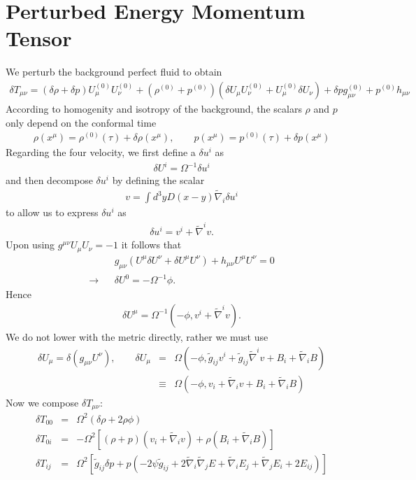 \documentclass[10pt,letterpaper]{article}
\numberwithin{equation}{section}
\begin{document}
\section{Perturbed Energy Momentum Tensor}
We perturb the background perfect fluid to obtain
\begin{eqnarray}
\delta T_{\mu\nu} = (\delta \rho + \delta p)U^{(0)}_\mu U^{(0)}_\nu + (\rho^{(0)} + p^{(0)})(\delta U_\mu U^{(0)}_\nu +U^{(0)}_\mu \delta U_\nu) + \delta p g^{(0)}_{\mu\nu} + p^{(0)} h_{\mu\nu}
\end{eqnarray}
According to homogenity and isotropy of the background, the scalars $\rho$ and $p$ only depend on the conformal time
\begin{eqnarray}
\rho(x^\mu) = \rho^{(0)}(\tau) + \delta \rho (x^\mu),\qquad p(x^\mu) = p^{(0)}(\tau) + \delta p (x^\mu)
\end{eqnarray}
Regarding the four velocity, we first define a $\delta u^i$ as
\begin{eqnarray}
\delta U^i = \Omega^{-1} \delta u^i
\end{eqnarray}
and then decompose $\delta u^i$ by defining the scalar
\begin{eqnarray}
v = \int d^3y D(x-y) \tilde\nabla_i \delta u^i
\end{eqnarray}
to allow us to express $\delta u^i$ as
\begin{eqnarray}
\delta u^i = v^i +\tilde\nabla^i v.
\end{eqnarray}
Upon using  $g^{\mu\nu}U_\mu U_\nu = -1$ it follows that
\begin{eqnarray}
&&g_{\mu\nu}(U^\mu\delta U^\nu + \delta U^\mu U^\nu) + h_{\mu\nu} U^\mu U^\nu = 0 
\nonumber\\
\to&& \delta U^0 = -\Omega^{-1}\phi.
\end{eqnarray}
Hence
\begin{eqnarray}
\delta U^\mu = \Omega^{-1}(-\phi, v^i+\tilde\nabla^i v).
\end{eqnarray}
We do not lower with the metric directly, rather we must use 
\begin{eqnarray}
\delta U_\mu = \delta(g_{\mu\nu} U^\nu),\qquad \delta U_\mu &=& \Omega(-\phi, \tilde g_{ij} v^i +\tilde g_{ij} \tilde\nabla^i v+B_i+\tilde\nabla_i B)
\nonumber\\
&\equiv &  \Omega(-\phi, v_i +\tilde \nabla_i v+B_i+\tilde\nabla_i B)
\end{eqnarray}
Now we compose $\delta T_{\mu\nu}$:
\begin{eqnarray}
\delta T_{00} &=& \Omega^2 ( \delta \rho + 2\rho \phi)
\nonumber\\
\delta T_{0i} &=& -\Omega^2 \left[ (\rho+p)(v_i +\tilde\nabla_i v)+\rho(B_i +\tilde\nabla_i B)\right]
\nonumber\\
\delta T_{ij} &=& \Omega^2 \left[ \tilde g_{ij} \delta p + p(-2\psi \tilde g_{ij} + 2\tilde\nabla_i \tilde\nabla_j E + \tilde\nabla_i E_j + \tilde\nabla_j E_i + 2E_{ij})\right]
\end{eqnarray}
\end{document}
